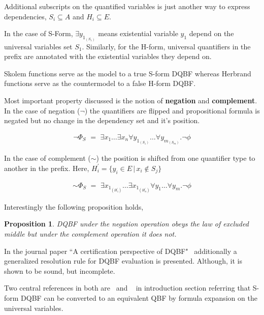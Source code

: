 \documentclass[runningheads]{llncs}
\newtheorem{prop}{Proposition}
\begin{document}
Additional subscripts on the quantified variables is just another way to express dependencies, $S_{i} \subseteq A$ and $H_{i} \subseteq E$.

In the case of S-Form, $\exists y_{1_{(S_{1})}}$ means  existential variable $y_{1}$ depend on the universal variables set $S_{1}$.
%
Similarly, for the H-form, universal quantifiers in the prefix are annotated with the existential variables they depend on.

Skolem functions serve as the model to a true S-form DQBF whereas Herbrand functions serve as the countermodel to a false H-form DQBF.

Most important property discussed is the notion of \textbf{negation} and \textbf{complement}.
%
In the case of negation ($\neg$) the quantifiers are flipped and propositional formula is negated but no change in the dependency set and it's position.

\begin{align}
\neg \Phi_{S} \,\, =   \,\, \exists x_{1}\dots \exists x_{n} \forall y_{1_{(S_{1})}}\dots\forall y_{m_{(S_{m})}} . \neg \phi \label{eq3}
\end{align}

In the case of complement ($\sim$) the position is shifted from one quantifier type to another in the prefix. Here, $H^{\prime}_{i} = \{ y_{i} \in E \, | \, x_{i} \notin S_{j} \}$

\begin{align}
\sim \Phi_{S} \,\, =   \,\, \exists x_{1_{(H^{\prime}_1)}}\dots \exists x_{1_{(H^{\prime}_n)}} \forall y_{1}\dots\forall y_{m} . \neg \phi \label{eq4}
\end{align}

Interestingly the following proposition holds,
\begin{prop}
	DQBF under the negation operation obeys the law of excluded middle but under the complement operation it does not.
\end{prop}

In the journal paper ``A certification perspective of DQBF"~\cite{balabanov2014henkin} additionally a generalized resolution rule for DQBF evaluation is presented. Although,  it is shown to be sound, but incomplete.

Two central references in both are~\cite{bubeck2006dependency} and ~\cite{bubeck2010model} in introduction section referring that S-form DQBF can be converted to an equivalent QBF by formula expansion on the universal variables.
\end{document}

